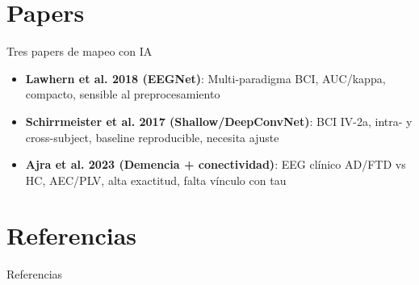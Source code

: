 \documentclass{beamer}
\begin{document}
\section{Papers}
\begin{frame}{Tres papers de mapeo con IA}
\begin{itemize}
  \item \textbf{Lawhern et al. 2018 (EEGNet)}: Multi-paradigma BCI, AUC/kappa, compacto, sensible al preprocesamiento \cite{Lawhern2018}
  \item \textbf{Schirrmeister et al. 2017 (Shallow/DeepConvNet)}: BCI IV-2a, intra- y cross-subject, baseline reproducible, necesita ajuste \cite{Schirrmeister2017}
  \item \textbf{Ajra et al. 2023 (Demencia + conectividad)}: EEG clínico AD/FTD vs HC, AEC/PLV, alta exactitud, falta vínculo con tau \cite{Ajra2023}
\end{itemize}
\end{frame}

\section{Referencias}
\begin{frame}[allowframebreaks]{Referencias}
  \printbibliography
\end{frame}
\end{document}
